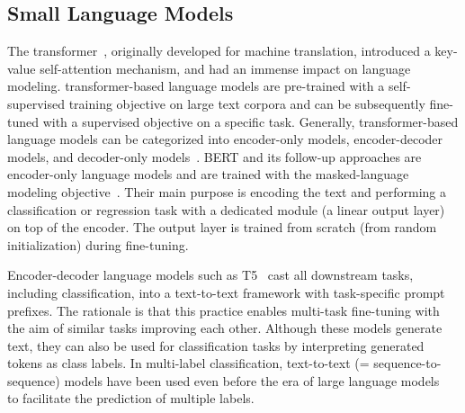\documentclass[acmsmall,nonacm]{acmart}
\begin{document}
\subsection{Small Language Models}
The transformer~\cite{DBLP:conf/nips/VaswaniSPUJGKP17}, originally developed for machine translation, introduced a key-value self-attention mechanism, and had an immense impact on language modeling.
transformer-based language models are pre-trained with a self-supervised training objective on large text corpora and can be subsequently fine-tuned with a supervised objective on a specific task.
Generally, transformer-based language models can be categorized into encoder-only models, encoder-decoder models, and decoder-only models~\cite{yang2023harnessing}.
BERT and its follow-up approaches are encoder-only language models and are trained with the masked-language modeling objective~\cite{DBLP:conf/naacl/DevlinCLT19}.
Their main purpose is encoding the text and performing a classification or regression task with a dedicated module (\eg a linear output layer) on top of the encoder.
The output layer is trained from scratch (\ie from random initialization) during fine-tuning.

Encoder-decoder language models such as T5~\cite{T5} cast all downstream tasks, including classification, into a text-to-text framework with task-specific prompt prefixes. The rationale is that this practice enables multi-task fine-tuning with the aim of similar tasks improving each other.
Although these models generate text, they can also be used for classification tasks by interpreting generated tokens as class labels. 
In multi-label classification, text-to-text (= sequence-to-sequence) models have been used even before the era of large language models~\cite{namMaximizingSubsetAccuracy2017} to facilitate the prediction of multiple labels.
\end{document}
